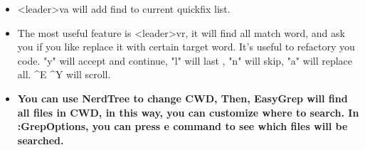\documentclass[paper=8.5in:11in, twoside, 12pt, pagesize=pdftex]{book}
\begin{document}
\begin{itemize}
										
										\item <leader>va will add find to current quickfix list. 
										
										\item The most useful feature is <leader>vr, it will find all match word, and ask you if you like replace it with certain target word. It's useful to refactory you code. "y" will accept and continue, "l" will last , "n" will skip, "a" will replace all. \^{}E \^{}Y will scroll.
										
										\item \textbf{You can use NerdTree to change CWD, Then, EasyGrep will find all files in CWD, in this way, you can customize where to search. In :GrepOptions, you can press e command to see which files will be searched.}
									\end{itemize}
									
\end{document}
